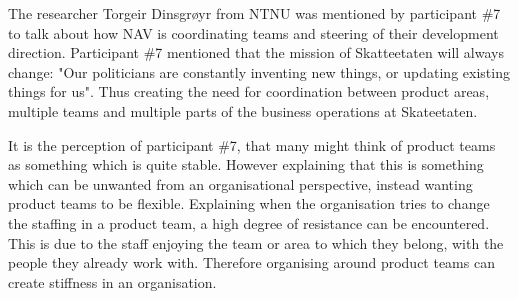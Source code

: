 

The researcher Torgeir Dinsgrøyr from NTNU was mentioned by participant \#7 to talk about how NAV is coordinating teams and steering of their development direction. Participant \#7 mentioned that the mission of Skatteetaten will always change: "Our politicians are constantly inventing new things, or updating existing things for us". Thus creating the need for coordination between product areas, multiple teams and multiple parts of the business operations at Skateetaten.


It is the perception of participant \#7, that many might think of product teams as something which is quite stable. However explaining that this is something which can be unwanted from an organisational perspective, instead wanting product teams to be flexible. Explaining when the organisation tries to change the staffing in a product team, a high degree of resistance can be encountered. This is due to the staff enjoying the team or area to which they belong, with the people they already work with. Therefore organising around product teams can create stiffness in an organisation.


